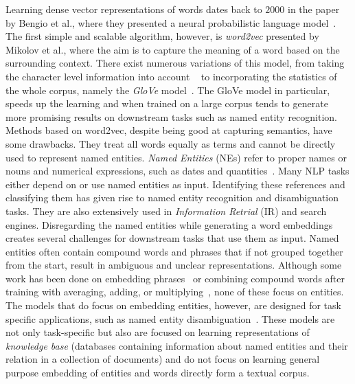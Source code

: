 Learning dense vector representations of words dates back to $2000$ in the paper by Bengio et al., where they presented a neural probabilistic language model~. The first simple and scalable algorithm, however, is \emph{word2vec} presented by Mikolov et al., where the aim is to capture the meaning of a word based on the surrounding context. There exist numerous variations of this model, from taking the character level information into account ~ to incorporating the statistics of the whole corpus, namely the \emph{GloVe} model~. The GloVe model in particular, speeds up the learning and when trained on a large corpus tends to generate more promising results on downstream tasks such as named entity recognition.\\
Methods based on word2vec, despite being good at capturing semantics, have some drawbacks. They treat all words equally as terms and cannot be directly used to represent named entities. \emph{Named Entities} (NEs) refer to proper names or nouns and numerical expressions, such as dates and quantities~.
Many NLP tasks either depend on or use named entities as input. Identifying these references and classifying them has given rise to named entity recognition and disambiguation tasks. They are also extensively used in \emph{Information Retrial} (IR) and search engines. Disregarding the named entities while generating a word embeddings creates several challenges for downstream tasks that use them as input. Named entities often contain compound words and phrases that if not grouped together from the start, result in ambiguous and unclear representations. Although some work has been done on embedding phrases~ or combining compound words after training with averaging, adding, or multiplying~, none of these focus on entities. The models that do focus on embedding entities, however, are designed for task specific applications, such as named entity disambiguation~. These models are not only task-specific but also are focused on learning representations of \emph{knowledge base} (databases containing information about named entities and their relation in a collection of documents) and do not focus on learning general purpose embedding of entities and words directly form a textual corpus.\\
